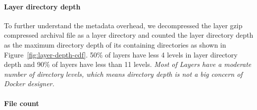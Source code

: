\paragraph{Layer directory depth}
To further understand the metadata overhead, we decompressed the layer gzip compressed archival file as a layer directory and counted the layer directory depth as the maximum directory depth of its containing directories as shown in Figure~\ref{fig:layer-depth-cdf}.
50\% of layers have less 4 levels in layer directory depth and 90\% of layers have less than 11 levels. 
\textit{Most of Layers have a moderate number of directory levels, which means directory depth is not a big concern of Docker designer.}

\paragraph{File count} 


